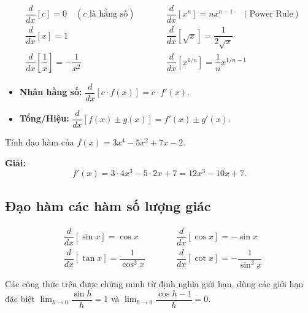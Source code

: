 \documentclass[12pt,a4paper]{article}
\begin{document}
\begin{congthuc}[title={Bảng đạo hàm cơ bản}]
  \begin{align*}
    &\dfrac{d}{dx}[c] = 0 \quad (c \text{ là hằng số})
    &\qquad&
    \dfrac{d}{dx}[x^n] = n x^{n-1} \quad (\text{Power Rule}) \\[6pt]
    &\dfrac{d}{dx}[x] = 1
    &&
    \dfrac{d}{dx}[\sqrt{x}] = \dfrac{1}{2\sqrt{x}} \\[6pt]
    &\dfrac{d}{dx}\!\left[\dfrac{1}{x}\right] = -\dfrac{1}{x^2}
    &&
    \dfrac{d}{dx}[x^{1/n}] = \dfrac{1}{n} x^{1/n - 1}
  \end{align*}
\end{congthuc}

\begin{tinhchat}[title={Các quy tắc kết hợp}]
  \begin{itemize}
    \item \textbf{Nhân hằng số:} $\dfrac{d}{dx}[c \cdot f(x)] = c \cdot f'(x)$.
    \item \textbf{Tổng/Hiệu:} $\dfrac{d}{dx}[f(x) \pm g(x)] = f'(x) \pm g'(x)$.
  \end{itemize}
\end{tinhchat}

\begin{vidu}
  Tính đạo hàm của $f(x) = 3x^4 - 5x^2 + 7x - 2$.

  \medskip\textbf{Giải:}
  \[
    f'(x) = 3 \cdot 4x^3 - 5 \cdot 2x + 7 = 12x^3 - 10x + 7.
  \]
\end{vidu}

\subsection{Đạo hàm các hàm số lượng giác}

\begin{congthuc}[title={Đạo hàm hàm lượng giác}]
  \begin{align*}
    &\dfrac{d}{dx}[\sin x] = \cos x
    &\qquad&
    \dfrac{d}{dx}[\cos x] = -\sin x \\[6pt]
    &\dfrac{d}{dx}[\tan x] = \dfrac{1}{\cos^2 x}
    &&
    \dfrac{d}{dx}[\cot x] = -\dfrac{1}{\sin^2 x}
  \end{align*}
\end{congthuc}

\begin{luuy}
  Các công thức trên được chứng minh từ định nghĩa giới hạn, dùng các giới hạn đặc biệt $\displaystyle\lim_{h \to 0} \dfrac{\sin h}{h} = 1$ và $\displaystyle\lim_{h \to 0} \dfrac{\cos h - 1}{h} = 0$.
\end{luuy}
\end{document}
